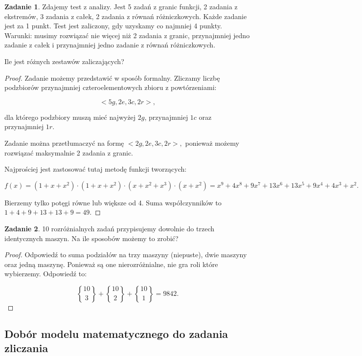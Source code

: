 \documentclass[11pt]{article}
\theoremstyle{definition}
\newtheorem{zadanie}{Zadanie}
\numberwithin{zadanie}{subsection}
\DeclareRobustCommand{\stirling}{\genfrac\{\}{0pt}{}}
\begin{document}
\begin{zadanie}
    Zdajemy test z analizy. Jest 5 zadań z granic funkcji, 2 zadania z ekstremów, 3 zadania z całek, 2 zadania z równań różniczkowych. Każde zadanie jest za 1 punkt. Test jest zaliczony, gdy uzyskamy co najmniej 4 punkty. Warunki: musimy rozwiązać nie więcej niż 2 zadania z granic, przynajmniej jedno zadanie z całek i przynajmniej jedno zadanie z równań różniczkowych.

    Ile jest różnych zestawów zaliczających?
\end{zadanie}
\begin{proof}
    Zadanie możemy przedstawić w sposób formalny. Zliczamy liczbę podzbiorów przynajmniej czteroelementowych zbioru z powtórzeniami:

    $$<5g,2e,3c,2r>,$$

    dla którego podzbiory muszą mieć najwyżej $2g$, przynajmniej $1c$ oraz przynajmniej $1r$.

    Zadanie można przetłumaczyć na formę $<2g,2e,3c,2r>,$ ponieważ możemy rozwiązać maksymalnie 2 zadania z granic.

    Najprościej jest zastosować tutaj metodę funkcji tworzących:

    $$f(x) = (1+x+x^2)\cdot(1+x+x^2)\cdot(x+x^2+x^3)\cdot(x+x^2)=x^9+4x^8+9x^7+13x^6+13x^5+9x^4+4x^3+x^2.$$

    Bierzemy tylko potęgi równe lub większe od 4. Suma współczynników to $1+4+9+13+13+9=49$.

\end{proof}

\begin{zadanie}
10 rozróżnialnych zadań przypisujemy dowolnie do trzech identycznych maszyn. Na ile sposobów możemy to zrobić?
\end{zadanie}

\begin{proof}
Odpowiedź to suma podziałów na trzy maszyny (niepuste), dwie maszyny oraz jedną maszynę. Ponieważ są one nierozróżnialne, nie gra roli które wybierzemy. Odpowiedź to:

$$\stirling{10}{3}+\stirling{10}{2}+\stirling{10}{1}=9842.$$
\end{proof}

\subsection{Dobór modelu matematycznego do zadania zliczania}
\end{document}
